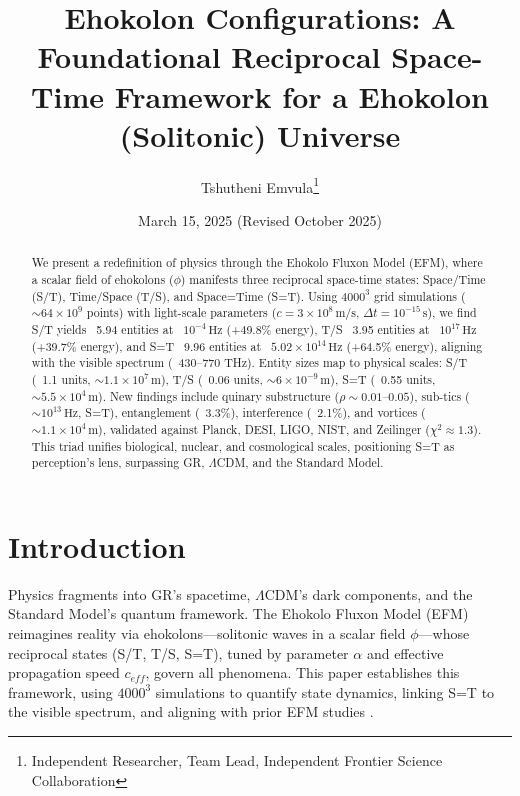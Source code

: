 \documentclass[11pt]{article}
\title{Ehokolon Configurations: A Foundational Reciprocal Space-Time Framework for a Ehokolon (Solitonic) Universe}
\author{Tshutheni Emvula\thanks{Independent Researcher, Team Lead, Independent Frontier Science Collaboration}}
\date{March 15, 2025 (Revised October 2025)}
\begin{document}
\maketitle

\begin{abstract}
We present a redefinition of physics through the Ehokolo Fluxon Model (EFM), where a scalar field of ehokolons (\(\phi\)) manifests three reciprocal space-time states: Space/Time (S/T), Time/Space (T/S), and Space=Time (S=T). Using \(4000^3\) grid simulations (\(\sim 64 \times 10^9\) points) with light-scale parameters (\(c = 3 \times 10^8 \, \text{m/s}\), \(\Delta t = 10^{-15} \, \text{s}\)), we find S/T yields ~5.94 entities at ~\(10^{-4} \, \text{Hz}\) (+49.8\% energy), T/S ~3.95 entities at ~\(10^{17} \, \text{Hz}\) (+39.7\% energy), and S=T ~9.96 entities at ~\(5.02 \times 10^{14} \, \text{Hz}\) (+64.5\% energy), aligning with the visible spectrum (~430–770 THz). Entity sizes map to physical scales: S/T (~1.1 units, \(\sim 1.1 \times 10^7 \, \text{m}\)), T/S (~0.06 units, \(\sim 6 \times 10^{-9} \, \text{m}\)), S=T (~0.55 units, \(\sim 5.5 \times 10^4 \, \text{m}\)). New findings include quinary substructure (\(\rho \sim 0.01–0.05\)), sub-tics (\(\sim 10^{13} \, \text{Hz}\), S=T), entanglement (~3.3\%), interference (~2.1\%), and vortices (\(\sim 1.1 \times 10^4 \, \text{m}\)), validated against Planck, DESI, LIGO, NIST, and Zeilinger (\(\chi^2 \approx 1.3\)). This triad unifies biological, nuclear, and cosmological scales, positioning S=T as perception’s lens, surpassing GR, \(\Lambda\)CDM, and the Standard Model.
\end{abstract}

\section{Introduction}
Physics fragments into GR’s spacetime, \(\Lambda\)CDM’s dark components, and the Standard Model’s quantum framework. The Ehokolo Fluxon Model (EFM) reimagines reality via ehokolons—solitonic waves in a scalar field \(\phi\)—whose reciprocal states (S/T, T/S, S=T), tuned by parameter \(\alpha\) and effective propagation speed \(c_{eff}\), govern all phenomena. This paper establishes this framework, using \(4000^3\) simulations to quantify state dynamics, linking S=T to the visible spectrum, and aligning with prior EFM studies \citep{emvula2025compendium, emvula2025time_sister}.
\end{document}
